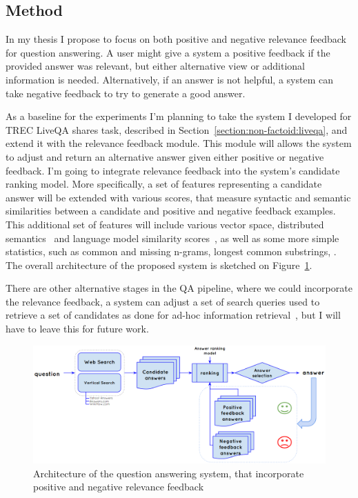 \subsection{Method}
\label{section:users:proposal:method}

In my thesis I propose to focus on both positive and negative relevance feedback for question answering.
A user might give a system a positive feedback if the provided answer was relevant, but either alternative view or additional information is needed.
Alternatively, if an answer is not helpful, a system can take negative feedback to try to generate a good answer.

As a baseline for the experiments I'm planning to take the system I developed for TREC LiveQA shares task, described in Section~\ref{section:non-factoid:liveqa}, and extend it with the relevance feedback module.
This module will allows the system to adjust and return an alternative answer given either positive or negative feedback.
I'm going to integrate relevance feedback into the system's candidate ranking model.
More specifically, a set of features representing a candidate answer will be extended with various scores, that measure syntactic and semantic similarities between a candidate and positive and negative feedback examples.
This additional set of features will include various vector space, distributed semantics~\cite{kusner2015word} and language model similarity scores~\cite{wang2008study}, as well as some more simple statistics, such as common and missing n-grams, longest common substrings, \etc.
The overall architecture of the proposed system is sketched on Figure~\ref{figure:users:proposal:model}.

There are other alternative stages in the QA pipeline, where we could incorporate the relevance feedback, \eg a system can adjust a set of search queries used to retrieve a set of candidates as done for ad-hoc information retrieval~\cite{rocchio1971relevance}, but I will have to leave this for future work.

\begin{figure}
\centering
\includegraphics[width=\textwidth]{img/userfeedback_model}
\caption{Architecture of the question answering system, that incorporate positive and negative relevance feedback}
\label{figure:users:proposal:model}
\end{figure}

